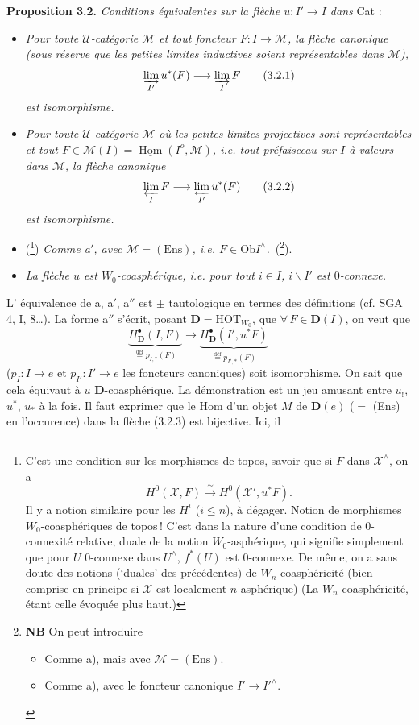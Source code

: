 \documentclass[11pt]{article}
\newcommand{\msp}[1]{\marginpar{\footnotesize [#1]}}
\newcommand{\HOT}{\mathrm{HOT}}
\newcommand{\Ob}{\mathrm{Ob}}
\newcommand{\Ens}{\mathrm{Ens}}
\newcommand{\defeq}{\overset{\text{déf}}{=}}
\newcommand{\uHom}{\underline{\operatorname{Hom}}}
\begin{document}
\noindent\textbf{Proposition 3.2.} \textit{Conditions équivalentes sur la flèche $u : I' \longrightarrow I$ dans} Cat :
\begin{itemize}
\item[a)] \textit{Pour toute $\mathcal{U}$-catégorie $\mathcal{M}$ et tout foncteur $F : I \longrightarrow \mathcal{M}$, la flèche canonique (sous réserve que les petites limites inductives soient représentables dans $\mathcal{M}$),}
\[
\varinjlim_{I'} u^*(F) \longrightarrow \varinjlim_{I} F \tag*{(3.2.1)}
\]
\msp{page 44}
\textit{est} \textit{isomorphisme.}
\item[a$'$)] \textit{Pour toute $\mathcal{U}$-catégorie $\mathcal{M}$ où les petites limites projectives sont représentables et tout $F \in \mathcal{M}(I) = \uHom(I^o,\mathcal{M})$, i.e. tout préfaisceau sur $I$ à valeurs dans $\mathcal{M}$, la flèche canonique}
\[
\varprojlim_{I} F \longrightarrow \varprojlim_{I'} u^*(F) \tag*{(3.2.2)}
\]
\textit{est} \textit{isomorphisme.}
\item[a$''$)] (\footnote[53]{C'est une condition sur les morphismes de topos, savoir que si $F$ dans $\mathcal{X}^{\wedge}$, on a
\[
H^0(\mathcal{X},F) \xrightarrow{\;\sim\;} H^0(\mathcal{X}',u^*F).
\]
Il y a notion similaire pour les $H^i$ ($i \leq n$), à dégager. Notion de morphismes $W_0$-coasphériques de topos\,! C'est dans la nature d'une condition de 0-connexité relative, duale de la notion $W_0$-asphérique, qui signifie simplement que pour $U$ 0-connexe dans $U^{\wedge}$, $f^*(U)$ est 0-connexe. De même, on a sans doute des notions (‘duales’ des précédentes) de $W_n$-coasphéricité (bien comprise en principe si $\mathcal{X}$ est localement $n$-asphérique) (La $W_n$-coasphéricité, étant celle évoquée plus haut.)}) \textit{Comme a$'$, avec $\mathcal{M} = (\Ens)$, i.e. $F \in \Ob I^{\wedge}$.}~(\footnote[54]{\textbf{NB} On peut introduire
\begin{itemize}
\item[a$'''$)] Comme a), mais avec $\mathcal{M} = (\Ens)$.
\item[a$^{IV}$)] Comme a), avec le foncteur canonique $I' \longrightarrow I'^{\wedge}$.
\end{itemize}}).
\item[b)] \textit{La flèche $u$ est $W_0$-coasphérique, i.e. pour tout $i \in I$, $i\backslash I'$ est $0$-connexe.}
\end{itemize}
L' équivalence de a, a$'$, a$''$ est $\pm$ tautologique en termes des définitions (cf. SGA 4, I, 8\dots). La forme a$''$ s'écrit, posant $\mathbf{D} = \HOT_{W_0}$, que $\forall\, F \in \mathbf{D}(I)$, on veut que
\[
\underbrace{H^{\bullet}_{\mathbf{D}}(I,F)}_{\defeq p_{I,*}(F)} \longrightarrow \underbrace{H^{\bullet}_{\mathbf{D}}(I',u^*F)}_{\defeq p_{I',*}(F)} \qquad \tag*{(3.2.3)}
\]
($p_I : I \longrightarrow e$ et $p_{I'} : I' \longrightarrow e$ les foncteurs canoniques) soit isomorphisme. On sait que cela équivaut à $u$ $\mathbf{D}$-coasphérique. La démonstration est un jeu amusant entre $u_!$, $u^*$, $u_*$ à la fois. Il faut exprimer que le Hom d'un objet $M$ de $\mathbf{D}(e)$ ($=$ (Ens) en l'occurence) dans la flèche (3.2.3) est bijective. Ici, il %
\end{document}
